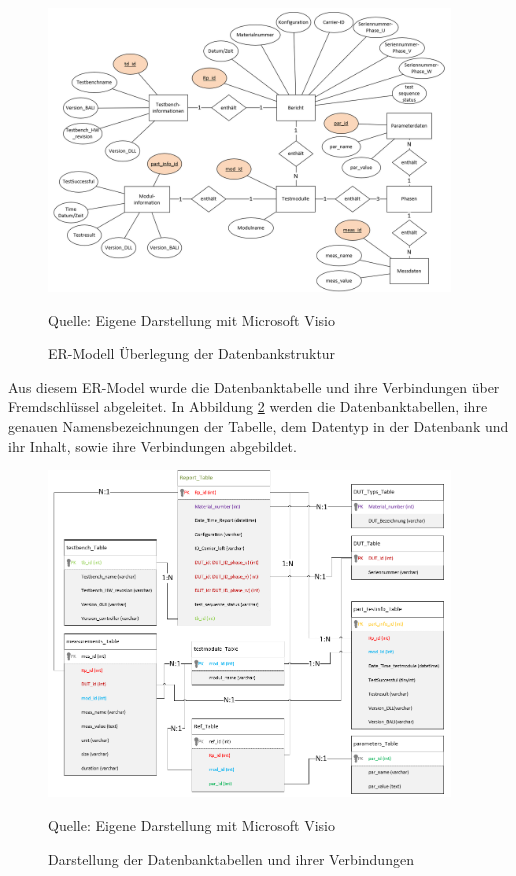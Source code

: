 \begin{figure}[H]
    \centering
    \includegraphics[width=0.95\textwidth]{Grafiken/Bild von ER-Modell}
    \caption{ER-Modell Überlegung der Datenbankstruktur}
    \label{fig: ER-Modell Überlegung der Datenbankstruktur}
    {Quelle: Eigene Darstellung mit Microsoft Visio}
\end{figure}

Aus diesem ER-Model wurde die Datenbanktabelle und ihre Verbindungen über Fremdschlüssel abgeleitet. In Abbildung \ref{fig: Darstellung der Datenbanktabellen und ihrer Verbindungen}
werden die Datenbanktabellen, ihre genauen Namensbezeichnungen der Tabelle, dem Datentyp in der Datenbank und ihr Inhalt, sowie ihre Verbindungen abgebildet.

\begin{figure}[H]
    \centering
    \includegraphics[width=0.95\textwidth]{Grafiken/Tabellendiagramm Datenbank}
    \caption{Darstellung der Datenbanktabellen und ihrer Verbindungen}
    \label{fig: Darstellung der Datenbanktabellen und ihrer Verbindungen}
    {Quelle: Eigene Darstellung mit Microsoft Visio}
\end{figure}